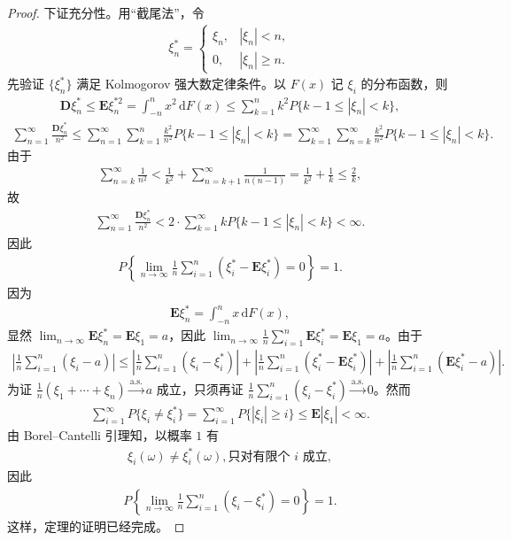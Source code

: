 \documentclass[../../main.tex]{subfiles}
\begin{document}
\begin{proof}
下证充分性。用``截尾法''，令
\begin{align}
\xi_n^{*}=
\begin{cases}
\xi_n,&|\xi_n|<n,\\
0,&|\xi_n|\geqslant n.
\end{cases}
\end{align}
先验证 $\{\xi_n^{*}\}$ 满足 Kolmogorov 强大数定律条件。以 $F(x)$ 记 $\xi_i$ 的分布函数，则
\begin{align*}
\boldsymbol{D}\xi_n^{*}\leqslant\boldsymbol{E}\xi_n^{*2}=\int_{-n}^{n}x^{2}\,\mathrm{d}F(x)\leqslant\sum_{k=1}^{n}k^{2}P\{k-1\leqslant|\xi_n|<k\},
\end{align*}
\begin{align*}
\sum_{n=1}^{\infty}\frac{\boldsymbol{D}\xi_n^{*}}{n^{2}}
\leqslant\sum_{n=1}^{\infty}\sum_{k=1}^{n}\frac{k^{2}}{n^{2}}P\{k-1\leqslant|\xi_n|<k\}
=\sum_{k=1}^{\infty}\sum_{n=k}^{\infty}\frac{k^{2}}{n^{2}}P\{k-1\leqslant|\xi_n|<k\}.
\end{align*}
由于
\begin{align*}
\sum_{n=k}^{\infty}\frac{1}{n^{2}}<\frac{1}{k^{2}}+\sum_{n=k+1}^{\infty}\frac{1}{n(n-1)}=\frac{1}{k^{2}}+\frac1k\leqslant\frac{2}{k},
\end{align*}
故
\begin{align*}
\sum_{n=1}^{\infty}\frac{\boldsymbol{D}\xi_n^{*}}{n^{2}}<2\cdot\sum_{k=1}^{\infty}kP\{k-1\leqslant|\xi_n|<k\}<\infty.
\end{align*}
因此
\begin{align}
P\!\left\{\lim_{n\to\infty}\frac1n\sum_{i=1}^{n}(\xi_i^{*}-\boldsymbol{E}\xi_i^{*})=0\right\}=1.
\end{align}
因为
\begin{align*}
\boldsymbol{E}\xi_n^{*}=\int_{-n}^{n}x\,\mathrm{d}F(x),
\end{align*}
显然 $\lim_{n\to\infty}\boldsymbol{E}\xi_n^{*}=\boldsymbol{E}\xi_1=a$，因此 $\lim_{n\to\infty}\frac1n\sum_{i=1}^{n}\boldsymbol{E}\xi_i^{*}=\boldsymbol{E}\xi_1=a$。由于
\begin{align}
\left|\frac1n\sum_{i=1}^{n}(\xi_i-a)\right|
\leqslant\left|\frac1n\sum_{i=1}^{n}(\xi_i-\xi_i^{*})\right|
+\left|\frac1n\sum_{i=1}^{n}(\xi_i^{*}-\boldsymbol{E}\xi_i^{*})\right|
+\left|\frac1n\sum_{i=1}^{n}(\boldsymbol{E}\xi_i^{*}-a)\right|.
\end{align}
为证 $\frac1n(\xi_1+\cdots+\xi_n)\xrightarrow{\mathrm{a.s.}}a$ 成立，只须再证 $\frac1n\sum_{i=1}^{n}(\xi_i-\xi_i^{*})\xrightarrow{\mathrm{a.s.}}0$。然而
\begin{align*}
\sum_{i=1}^{\infty}P\{\xi_i\neq\xi_i^{*}\}=\sum_{i=1}^{\infty}P\{|\xi_i|\geqslant i\}\leqslant\boldsymbol{E}|\xi_1|<\infty.
\end{align*}
由 Borel--Cantelli 引理知，以概率 $1$ 有
\begin{align*}
\xi_i(\omega)\neq\xi_i^{*}(\omega),\text{只对有限个 }i\text{ 成立},
\end{align*}
因此
\begin{align*}
P\!\left\{\lim_{n\to\infty}\frac1n\sum_{i=1}^{n}(\xi_i-\xi_i^{*})=0\right\}=1.
\end{align*}
这样，定理的证明已经完成。
\end{proof}
\end{document}
